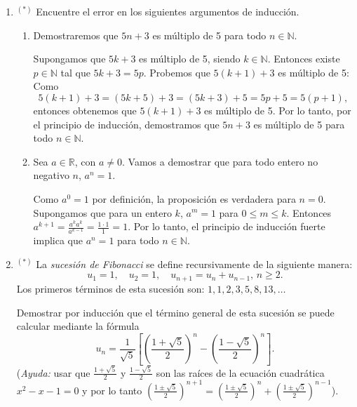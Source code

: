 \documentclass[a4paper,12pt,twoside,spanish,reqno]{amsbook}
\numberwithin{equation}{section}
\begin{document}
\begin{enumerate}[resume]
\item${}^{(*)}$ Encuentre el error en los siguientes argumentos de inducción.
\begin{enumerate}
\item  Demostraremos que $5n+3$ es múltiplo de 5 para todo $n\in \mathbb N$.

Supongamos que $5k+3$ es múltiplo de 5, siendo $k\in \mathbb N$. Entonces existe
$p\in \mathbb N$ tal que  $5k+3=5p$. Probemos que $5(k+1)+3$ es múltiplo de 5:
Como
$$
5(k+1)+3=(5k+5)+3=(5k+3)+5=5p+5=5(p+1),
$$
entonces obtenemos que $5(k+1)+3$ es múltiplo de 5. Por lo tanto, por el principio
de inducción, demostramos que $5n+3$ es múltiplo de 5 para todo $n\in \mathbb
N$.

\item Sea $a\in\mathbb R$, con $a\neq 0$. Vamos a demostrar que para todo entero no negativo $n$, $a^n=1$.

Como $a^0=1$ por definición, la proposición es verdadera para $n=0$. Supongamos
que para  un entero $k$, $a^m=1$ para $0\leq m \leq k$. Entonces
$a^{k+1}= \frac{a^k a^k}{a^{k-1}}=\frac{1\cdot1}1=1$.
Por lo tanto, el principio de inducción fuerte implica que $a^n=1$ para todo $n\in \mathbb N$.
\end{enumerate}

\item${}^{(*)}$ La \emph{sucesión de Fibonacci} se define recursivamente de la siguiente manera:
$$
u_1=1,\quad u_2=1,\quad u_{n+1}=u_{n}+u_{n-1}, \, n\geq 2.
$$
Los primeros términos de esta sucesión son: $1,1,2,3,5,8,13,\ldots$

Demostrar por inducción que el término general de esta sucesión se puede calcular mediante la fórmula
\[ u_n= \frac{1}{\sqrt{5}}\left[\left(\frac{1+\sqrt{5}}{2}\right)^n-\left(\frac{1-\sqrt{5}}{2}\right)^n\right].\]
(\textit{Ayuda:} usar que $\frac{1+\sqrt{5}}{2}$ y $\frac{1-\sqrt{5}}{2}$ son las raíces de la ecuación cuadrática $x^2-x-1=0$ y por lo tanto  $\left(\frac{1\pm\sqrt{5}}{2}\right)^{n+1} = \left(\frac{1\pm\sqrt{5}}{2}\right)^{n}+\left(\frac{1\pm\sqrt{5}}{2}\right)^{n-1}$).


\end{enumerate}
\end{document}
